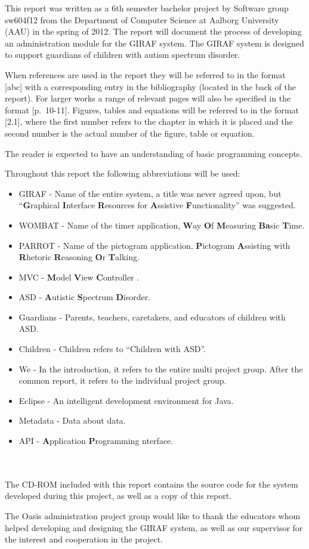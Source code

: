 This report was written as a 6th semester bachelor project by Software group sw604f12 from the Department of Computer Science at Aalborg University (AAU) in the spring of 2012. The report will document the process of developing an administration module for the GIRAF system. The GIRAF system is designed to support guardians of children with autism spectrum disorder.

When references are used in the report they will be referred to in the format [abc] with a corresponding entry in the bibliography (located in the back of the report). For larger works a range of relevant pages will also be specified in the format [p.~10-11]. Figures, tables and equations will be referred to in the format [2.1], where the first number refers to the chapter in which it is placed and the second number is the actual number of the figure, table or equation.

The reader is expected to have an understanding of basic programming concepts.

Throughout this report the following abbreviations will be used:

\begin{itemize}
	\item GIRAF - Name of the entire system, a title was never agreed upon, but ``\textbf{G}raphical
	\textbf{I}nterface \textbf{R}esources for \textbf{A}ssistive \textbf{F}unctionality'' was suggested.
	\item WOMBAT - Name of the timer application, \textbf{W}ay \textbf{O}f \textbf{M}easuring \textbf{Ba}sic \textbf{T}ime. 
	\item PARROT - Name of the pictogram application, \textbf{P}ictogram \textbf{A}ssisting with \textbf{R}hetoric \textbf{R}easoning \textbf{O}r \textbf{T}alking.
	\item MVC - \textbf{M}odel \textbf{V}iew \textbf{C}ontroller \cite{MVC}.
	\item ASD - \textbf{A}utistic \textbf{S}pectrum \textbf{D}isorder.
	\item Guardians - Parents, teachers, caretakers, and educators of children with ASD.
	\item Children - Children refers to ``Children with ASD''.
	\item We - In the introduction, it refers to the entire multi project group. After the common report, it refers to the individual project group.
	\item Eclipse - An intelligent development environment for Java.
	\item Metadata - Data about data.
	\item API - \textbf{A}pplication \textbf{P}rogramming nterface.
\end{itemize}

\\ \\

The CD-ROM included with this report contains the source code for the system developed during this project, as well as a copy of this report.

The Oasis administration project group would like to thank the educators whom helped developing and designing the GIRAF system, as well as our supervisor for the interest and cooperation in the project.